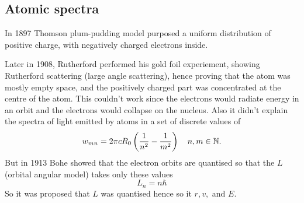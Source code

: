 \documentclass{article}
\begin{document}
\subsection{Atomic spectra}
In 1897 Thomson plum-pudding model purposed a uniform distribution of positive charge, with negatively charged electrons inside.\par
Later in 1908, Rutherford performed his gold foil experiement, showing Rutherford scattering (large angle scattering), hence proving that the atom was mostly empty space, and the positively charged part was concentrated at the centre of the atom. This couldn't work since the electrons would radiate energy in an orbit and the electrons would collapse on the nucleus. Also it didn't explain the spectra of light emitted by atoms in a set of discrete values of 
\[
	w_{mn}=2\pi c R_0\left(\frac 1 {n^2}-\frac 1{m^2}\right)\quad n,m\in \mathbb{N}.
\]
But in 1913 Bohe showed that the electron orbits are quantised so that the $ L $ (orbital angular model) takes only these values
\[
  L_n=n\hbar
\]
So it was proposed that $ L $ was quantised hence so it $ r, v, $ and $ E $.
\end{document}
